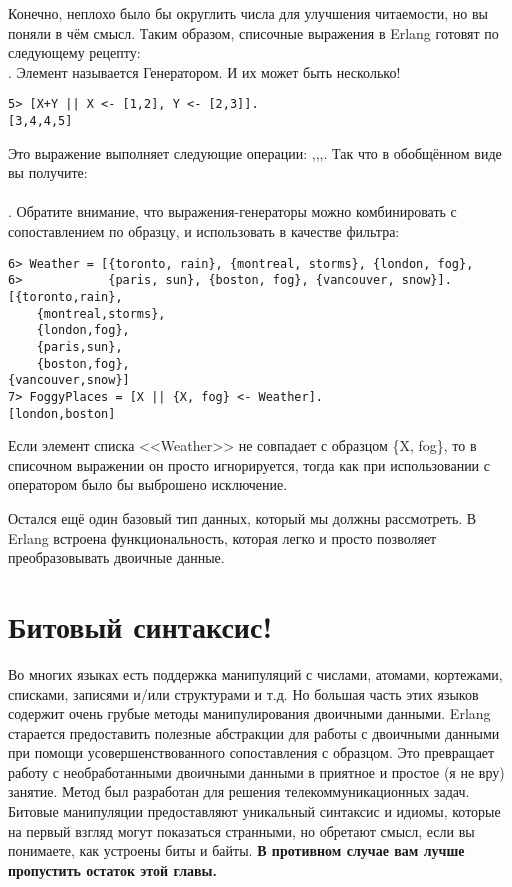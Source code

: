 Конечно, неплохо было бы округлить числа для улучшения читаемости, но вы поняли в чём смысл.
Таким образом, списочные выражения в Erlang готовят по следующему рецепту: \ops{NewList = [Expression || Pattern}\\ 
\ops{ $<-$ List, Condition1, Condition2, ... ConditionN]}.
Элемент  называется Генератором.
И их может быть несколько!\\ 
\begin{lstlisting}[style=repl]
5> [X+Y || X <- [1,2], Y <- [2,3]].
[3,4,4,5]
\end{lstlisting}

Это выражение выполняет следующие операции: ,,,.
Так что в обобщённом виде вы получите: \\ 
\ops{[Expression || GeneratorExp1, GeneratorExp2, ..., GeneratorExpN,}\\ 
\ops{Condition1, Condition2, ... ConditionM]}.
Обратите внимание, что выражения\--генераторы можно комбинировать с сопоставлением по образцу, и использовать в качестве фильтра:
\begin{lstlisting}[style=repl]
6> Weather = [{toronto, rain}, {montreal, storms}, {london, fog},  
6>            {paris, sun}, {boston, fog}, {vancouver, snow}].
[{toronto,rain},
    {montreal,storms},
    {london,fog},
    {paris,sun},
    {boston,fog},
{vancouver,snow}]
7> FoggyPlaces = [X || {X, fog} <- Weather].
[london,boston]
\end{lstlisting}

Если элемент списка <<Weather>> не совпадает с образцом \{X, fog\}, то в списочном выражении он просто игнорируется, тогда как при использовании с оператором \ops{=} было бы выброшено исключение.

Остался ещё один базовый тип данных, который мы должны рассмотреть.
В Erlang встроена функциональность, которая легко и просто позволяет преобразовывать двоичные данные.
\section{Битовый синтаксис!}
\label{bit-syntax}
Во многих языках есть поддержка манипуляций с числами, атомами, кортежами, списками, записями и/или структурами и т.д.
Но большая часть этих языков содержит очень грубые методы манипулирования двоичными данными.
Erlang старается предоставить полезные абстракции для работы с двоичными данными при помощи усовершенствованного сопоставления с образцом.
Это превращает работу с необработанными двоичными данными в приятное и простое (я не вру) занятие.
Метод был разработан для решения телекоммуникационных задач.
Битовые манипуляции предоставляют уникальный синтаксис и идиомы, которые на первый взгляд могут показаться странными, но обретают смысл, если вы понимаете, как устроены биты и байты.
\textbf{В противном случае вам лучше пропустить остаток этой главы.}

